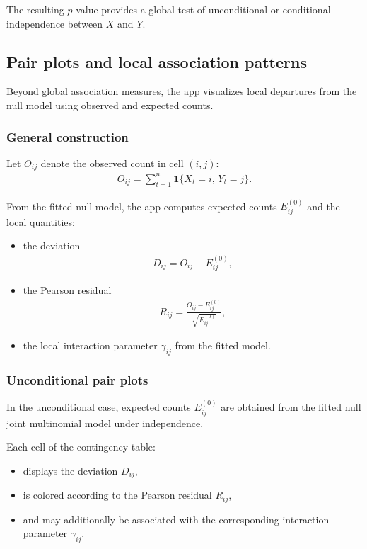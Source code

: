 \documentclass[11pt,a4paper]{article}
\begin{document}
The resulting $p$-value provides a global test of unconditional or conditional independence between $X$ and $Y$.

\subsection{Pair plots and local association patterns}

Beyond global association measures, the app visualizes local departures from the null model using observed and expected counts.

\subsubsection*{General construction}

Let $O_{ij}$ denote the observed count in cell $(i,j)$:
\begin{align}
O_{ij}
=
\sum_{t=1}^n \mathbf{1}\{X_t=i,\,Y_t=j\}.
\end{align}

From the fitted null model, the app computes expected counts $E^{(0)}_{ij}$ and the local quantities:
\begin{itemize}
\item the deviation
\begin{align}
D_{ij} = O_{ij} - E^{(0)}_{ij},
\end{align}
\item the Pearson residual
\begin{align}
R_{ij}
=
\frac{
O_{ij} - E^{(0)}_{ij}
}{
\sqrt{E^{(0)}_{ij}}
},
\end{align}
\item the local interaction parameter $\gamma_{ij}$ from the fitted model.
\end{itemize}

\subsubsection*{Unconditional pair plots}

In the unconditional case, expected counts $E^{(0)}_{ij}$ are obtained from the fitted null joint multinomial model under independence.

Each cell of the contingency table:
\begin{itemize}
\item displays the deviation $D_{ij}$,
\item is colored according to the Pearson residual $R_{ij}$,
\item and may additionally be associated with the corresponding interaction parameter $\gamma_{ij}$.
\end{itemize}
\end{document}
